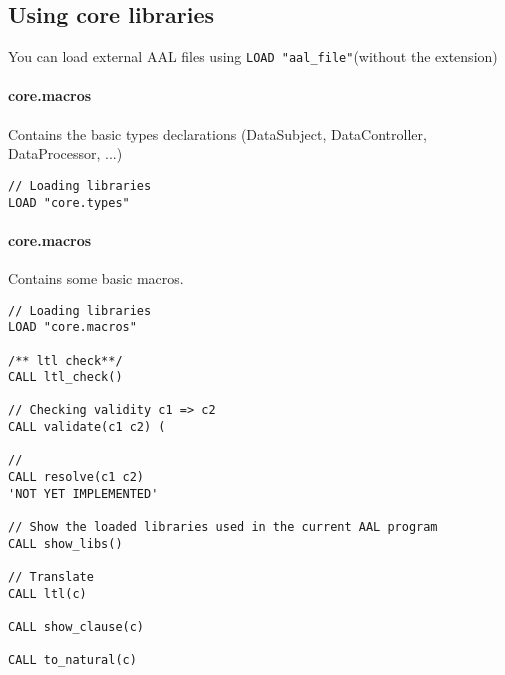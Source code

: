 \subsection{Using core libraries}
You can load external AAL files using \texttt{LOAD "aal\_file"}(without the extension) 

\paragraph{core.macros} Contains the basic types declarations (DataSubject, DataController, DataProcessor, ...)
\begin{lstlisting}
// Loading libraries
LOAD "core.types"
\end{lstlisting}



\paragraph{core.macros} Contains some basic macros.
\begin{lstlisting}
// Loading libraries
LOAD "core.macros"

/** ltl check**/
CALL ltl_check()

// Checking validity c1 => c2
CALL validate(c1 c2) (

//
CALL resolve(c1 c2)
'NOT YET IMPLEMENTED'

// Show the loaded libraries used in the current AAL program
CALL show_libs()

// Translate 
CALL ltl(c)

CALL show_clause(c)

CALL to_natural(c)
\end{lstlisting}

